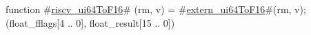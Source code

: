 function #\hyperref[sailRISCVzriscvzyui64ToF16]{riscv\_ui64ToF16}# (rm, v) = {
  #\hyperref[sailRISCVzexternzyui64ToF16]{extern\_ui64ToF16}#(rm, v);
  (float_fflags[4 .. 0], float_result[15 .. 0])
}

